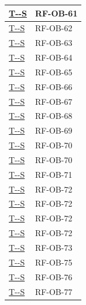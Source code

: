 \documentclass[a4paper,12pt]{article}
\newcounter{testsys}
\newcommand{\systestref}{%
  \hyperlink{T-\arabic{testsys}-S}{T-\arabic{testsys}-S}%
}
\begin{document}
\begin{center}
\begin{longtable}{|>{\centering\arraybackslash}p{5cm}|>{\centering\arraybackslash}p{9cm}|}
\stepcounter{testsys}
\systestref & RF-OB-61 \\
\hline

\stepcounter{testsys}
\systestref & RF-OB-62 \\
\hline

\stepcounter{testsys}
\systestref & RF-OB-63 \\
\hline

\stepcounter{testsys}
\systestref & RF-OB-64 \\
\hline

\stepcounter{testsys}
\systestref & RF-OB-65 \\
\hline

\stepcounter{testsys}
\systestref & RF-OB-66 \\
\hline

\stepcounter{testsys}
\systestref & RF-OB-67 \\
\hline

\stepcounter{testsys}
\systestref & RF-OB-68 \\
\hline

\stepcounter{testsys}
\systestref & RF-OB-69 \\
\hline

\stepcounter{testsys}
\systestref & RF-OB-70 \\
\hline

\stepcounter{testsys}
\systestref & RF-OB-70 \\
\hline

\stepcounter{testsys}
\systestref & RF-OB-71 \\
\hline

\stepcounter{testsys}
\systestref & RF-OB-72 \\
\hline

\stepcounter{testsys}
\systestref & RF-OB-72 \\
\hline

\stepcounter{testsys}
\systestref & RF-OB-72 \\
\hline

\stepcounter{testsys}
\systestref & RF-OB-72 \\
\hline

\stepcounter{testsys}
\systestref & RF-OB-73 \\
\hline

\stepcounter{testsys}
\systestref & RF-OB-75 \\
\hline

\stepcounter{testsys}
\systestref & RF-OB-76 \\
\hline

\stepcounter{testsys}
\systestref & RF-OB-77 \\
\hline


\end{longtable}
\end{center}
\end{document}
